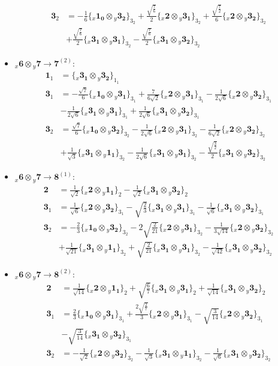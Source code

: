 \documentclass[english]{article}
\newcommand{\rep}[1]{\mathbf{#1}}
\newcommand{\repx}[2]{{}_{#2}\mathbf{#1}}
\newcommand{\tsprodx}[2]{\repx{#1}{x}\otimes\repx{#2}{y}}
\newcommand{\subcgs}[3]{\big\{ \tsprodx{#1}{#2}\big\}^{}_{#3}}
\begin{document}
\begin{itemize}
\begin{align*}
\\
\rep{3}_{2} & = -\frac{1}{6}\subcgs{1_{0}}{3_{2}}{3_{2}}+\frac{\sqrt{\frac{7}{6}}}{2}\subcgs{2}{3_{1}}{3_{2}}+\frac{\sqrt{\frac{7}{2}}}{6}\subcgs{2}{3_{2}}{3_{2}} \\ 
 & +\frac{\sqrt{\frac{7}{6}}}{2}\subcgs{3_{1}}{3_{1}}{3_{2}}-\frac{\sqrt{\frac{7}{6}}}{2}\subcgs{3_{1}}{3_{2}}{3_{2}}
\end{align*}
\item $\tsprodx{6}{7}\to\rep{7}^{(2)}$:
\begin{align*}
\rep{1}_{1} & = \subcgs{3_{1}}{3_{2}}{1_{1}}
\\
\rep{3}_{1} & = -\frac{\sqrt{7}}{6}\subcgs{1_{0}}{3_{1}}{3_{1}}+\frac{7}{6 \sqrt{2}}\subcgs{2}{3_{1}}{3_{1}}-\frac{1}{2 \sqrt{6}}\subcgs{2}{3_{2}}{3_{1}} \\ 
 & -\frac{1}{2 \sqrt{6}}\subcgs{3_{1}}{3_{1}}{3_{1}}+\frac{1}{2 \sqrt{6}}\subcgs{3_{1}}{3_{2}}{3_{1}}
\\
\rep{3}_{2} & = \frac{\sqrt{7}}{6}\subcgs{1_{0}}{3_{2}}{3_{2}}-\frac{1}{2 \sqrt{6}}\subcgs{2}{3_{1}}{3_{2}}-\frac{1}{6 \sqrt{2}}\subcgs{2}{3_{2}}{3_{2}} \\ 
 & +\frac{1}{\sqrt{3}}\subcgs{3_{1}}{1_{1}}{3_{2}}-\frac{1}{2 \sqrt{6}}\subcgs{3_{1}}{3_{1}}{3_{2}}-\frac{\sqrt{\frac{3}{2}}}{2}\subcgs{3_{1}}{3_{2}}{3_{2}}
\end{align*}
\item $\tsprodx{6}{7}\to\rep{8}^{(1)}$:
\begin{align*}
\rep{2} & = \frac{1}{\sqrt{2}}\subcgs{2}{1_{1}}{2}-\frac{1}{\sqrt{2}}\subcgs{3_{1}}{3_{2}}{2}
\\
\rep{3}_{1} & = \frac{1}{\sqrt{6}}\subcgs{2}{3_{2}}{3_{1}}-\sqrt{\frac{2}{3}}\subcgs{3_{1}}{3_{1}}{3_{1}}-\frac{1}{\sqrt{6}}\subcgs{3_{1}}{3_{2}}{3_{1}}
\\
\rep{3}_{2} & = -\frac{2}{3}\subcgs{1_{0}}{3_{2}}{3_{2}}-2 \sqrt{\frac{2}{21}}\subcgs{2}{3_{1}}{3_{2}}-\frac{1}{3 \sqrt{14}}\subcgs{2}{3_{2}}{3_{2}} \\ 
 & +\frac{1}{\sqrt{21}}\subcgs{3_{1}}{1_{1}}{3_{2}}+\sqrt{\frac{2}{21}}\subcgs{3_{1}}{3_{1}}{3_{2}}-\frac{1}{\sqrt{42}}\subcgs{3_{1}}{3_{2}}{3_{2}}
\end{align*}
\item $\tsprodx{6}{7}\to\rep{8}^{(2)}$:
\begin{align*}
\rep{2} & = \frac{1}{\sqrt{14}}\subcgs{2}{1_{1}}{2}+\sqrt{\frac{6}{7}}\subcgs{3_{1}}{3_{1}}{2}+\frac{1}{\sqrt{14}}\subcgs{3_{1}}{3_{2}}{2}
\\
\rep{3}_{1} & = \frac{2}{3}\subcgs{1_{0}}{3_{1}}{3_{1}}+\frac{2 \sqrt{\frac{2}{7}}}{3}\subcgs{2}{3_{1}}{3_{1}}-\sqrt{\frac{3}{14}}\subcgs{2}{3_{2}}{3_{1}} \\ 
 & -\sqrt{\frac{3}{14}}\subcgs{3_{1}}{3_{2}}{3_{1}}
\\
\rep{3}_{2} & = -\frac{1}{\sqrt{2}}\subcgs{2}{3_{2}}{3_{2}}-\frac{1}{\sqrt{3}}\subcgs{3_{1}}{1_{1}}{3_{2}}-\frac{1}{\sqrt{6}}\subcgs{3_{1}}{3_{2}}{3_{2}}
\end{align*}
\end{itemize}
\end{document}
